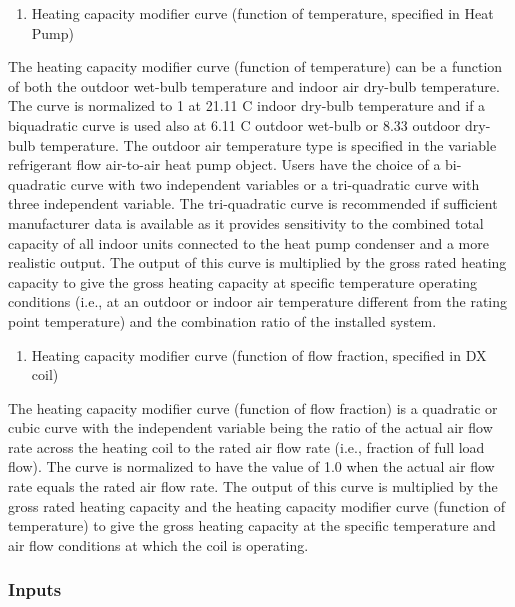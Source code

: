 \begin{enumerate}
\def\labelenumi{\arabic{enumi})}
\tightlist
\item
  Heating capacity modifier curve (function of temperature, specified in Heat Pump)
\end{enumerate}

The heating capacity modifier curve (function of temperature) can be a function of both the outdoor wet-bulb temperature and indoor air dry-bulb temperature. The curve is normalized to 1 at 21.11 C indoor dry-bulb temperature and if a biquadratic curve is used also at 6.11 C outdoor wet-bulb or 8.33 outdoor dry-bulb temperature. The outdoor air temperature type is specified in the variable refrigerant flow air-to-air heat pump object. Users have the choice of a bi-quadratic curve with two independent variables or a tri-quadratic curve with three independent variable. The tri-quadratic curve is recommended if sufficient manufacturer data is available as it provides sensitivity to the combined total capacity of all indoor units connected to the heat pump condenser and a more realistic output. The output of this curve is multiplied by the gross rated heating capacity to give the gross heating capacity at specific temperature operating conditions (i.e., at an outdoor or indoor air temperature different from the rating point temperature) and the combination ratio of the installed system.

\begin{enumerate}
\def\labelenumi{\arabic{enumi})}
\setcounter{enumi}{1}
\tightlist
\item
  Heating capacity modifier curve (function of flow fraction, specified in DX coil)
\end{enumerate}

The heating capacity modifier curve (function of flow fraction) is a quadratic or cubic curve with the independent variable being the ratio of the actual air flow rate across the heating coil to the rated air flow rate (i.e., fraction of full load flow). The curve is normalized to have the value of 1.0 when the actual air flow rate equals the rated air flow rate. The output of this curve is multiplied by the gross rated heating capacity and the heating capacity modifier curve (function of temperature) to give the gross heating capacity at the specific temperature and air flow conditions at which the coil is operating.

\subsubsection{Inputs}\label{inputs-7-010}

